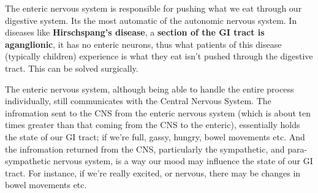 \documentclass[12pt, a4paper]{article}
\begin{document}
The enteric nervous system is responsible for pushing what we eat through our digestive system. Its the most automatic of the 
autonomic nervous system. In diseases like \textbf{Hirschspang's disease}, a \textbf{section of the 
GI tract is aganglionic}, it has no enteric neurons, thus what patients of this disease (typically children) experience is
what they eat isn't pushed through the digestive tract. This can be solved surgically.

The enteric nervous system, although being able to handle the entire process individually,
still communicates with the Central Nervous System. The infromation sent to the CNS from the enteric nervous system (which is about ten times greater than that coming from the CNS to the enteric),
essentially holds the state of our GI tract; if we're full, gassy, hungry, bowel movements etc. And the infromation returned from the CNS,
particularly the sympathetic, and para-sympathetic nervous system, is a way our mood may influence the state of our GI tract.
For instance, if we're really excited, or nervous, there may be changes in bowel movements etc.
\end{document}
